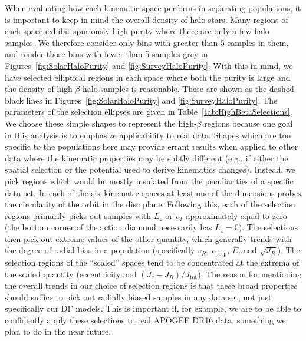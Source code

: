 When evaluating how each kinematic space performs in separating populations, it is important to keep in mind the overall density of halo stars. Many regions of each space exhibit spuriously high purity where there are only a few halo samples. We therefore consider only bins with greater than 5 samples in them, and render those bins with fewer than 5 samples grey in Figures~\ref{fig:SolarHaloPurity} and \ref{fig:SurveyHaloPurity}. With this in mind, we have selected elliptical regions in each space where both the purity is large and the density of high-$\beta$ halo samples is reasonable. These are shown as the dashed black lines in Figures~\ref{fig:SolarHaloPurity} and \ref{fig:SurveyHaloPurity}. The parameters of the selection ellipses are given in Table~\ref{tab:HighBetaSelections}. We choose these simple shapes to represent the high-$\beta$ regions because one goal in this analysis is to emphasize applicability to real data. Shapes which are too specific to the populations here may provide errant results when applied to other data where the kinematic properties may be subtly different (e.g., if either the spatial selection or the potential used to derive kinematics changes). Instead, we pick regions which would be mostly insulated from the peculiarities of a specific data set. In each of the six kinematic spaces at least one of the dimensions probes the circularity of the orbit in the disc plane. Following this, each of the selection regions primarily picks out samples with $L_{z}$ or $v_{T}$ approximately equal to zero (the bottom corner of the action diamond necessarily has $L_{z}=0$). The selections then pick out extreme values of the other quantity, which generally trends with the degree of radial bias in a population (specifically $v_{R}$, $v_\mathrm{perp}$, $E$, and $\sqrt{J_{R}}$). The selection regions of the ``scaled'' spaces tend to be concentrated at the extrema of the scaled quantity (eccentricity and $(J_{z}-J_{R})/J_\mathrm{tot}$). The reason for mentioning the overall trends in our choice of selection regions is that these broad properties should suffice to pick out radially biased samples in any data set, not just specifically our DF models. This is important if, for example, we are to be able to confidently apply these selections to real APOGEE DR16 data, something we plan to do in the near future. 

